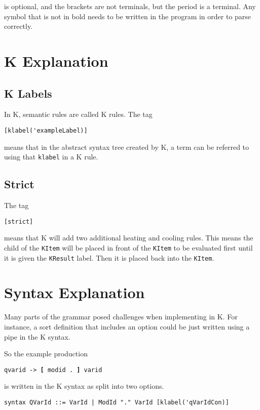 \noindent
is optional, and the brackets are not terminals, but the period is a terminal. Any symbol that is not in bold needs to be written in the program in order to parse correctly.

\section{K Explanation}
\subsection{K Labels}
In K, semantic rules are called K rules. The tag

\begin{lstlisting}
[klabel('exampleLabel)]
\end{lstlisting}

\noindent
means that in the abstract syntax tree created by K, a term can be referred to using that \texttt{klabel} in a K rule.

\subsection{Strict}
The tag

\begin{lstlisting}
[strict]
\end{lstlisting}

\noindent
means that K will add two additional heating and cooling rules. This means the child of the \texttt{KItem} will be placed in front of the \texttt{KItem} to be evaluated first until it is given the \texttt{KResult} label. Then it is placed back into the \texttt{KItem}.

\section{Syntax Explanation}
Many parts of the grammar posed challenges when implementing in K. For instance, a sort definition that includes an option could be just written using a pipe
in the K syntax.

So the example production

\texttt{qvarid -> \textbf{[} modid . \textbf{]} varid}

\noindent
is written in the K syntax as split into two options.

\begin{lstlisting}
syntax QVarId ::= VarId | ModId "." VarId [klabel('qVarIdCon)]
\end{lstlisting}

